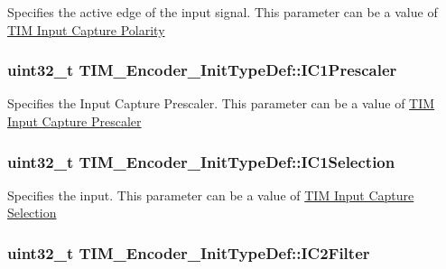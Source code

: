 Specifies the active edge of the input signal. This parameter can be a value of \hyperlink{group___t_i_m___input___capture___polarity}{T\-I\-M Input Capture Polarity} \hypertarget{struct_t_i_m___encoder___init_type_def_a56307eb4766e3f0e1cd1cd3c4fc2157e}{
\subsubsection[{I\-C1\-Prescaler}]{\setlength{\rightskip}{0pt plus 5cm}uint32\-\_\-t T\-I\-M\-\_\-\-Encoder\-\_\-\-Init\-Type\-Def\-::\-I\-C1\-Prescaler}}\label{struct_t_i_m___encoder___init_type_def_a56307eb4766e3f0e1cd1cd3c4fc2157e}
Specifies the Input Capture Prescaler. This parameter can be a value of \hyperlink{group___t_i_m___input___capture___prescaler}{T\-I\-M Input Capture Prescaler} \hypertarget{struct_t_i_m___encoder___init_type_def_a85fbdebacff594ff1ad0d16eddfdc179}{
\subsubsection[{I\-C1\-Selection}]{\setlength{\rightskip}{0pt plus 5cm}uint32\-\_\-t T\-I\-M\-\_\-\-Encoder\-\_\-\-Init\-Type\-Def\-::\-I\-C1\-Selection}}\label{struct_t_i_m___encoder___init_type_def_a85fbdebacff594ff1ad0d16eddfdc179}
Specifies the input. This parameter can be a value of \hyperlink{group___t_i_m___input___capture___selection}{T\-I\-M Input Capture Selection} \hypertarget{struct_t_i_m___encoder___init_type_def_a30cdb580735007aa9735b2f5cc133049}{
\subsubsection[{I\-C2\-Filter}]{\setlength{\rightskip}{0pt plus 5cm}uint32\-\_\-t T\-I\-M\-\_\-\-Encoder\-\_\-\-Init\-Type\-Def\-::\-I\-C2\-Filter}}\label{struct_t_i_m___encoder___init_type_def_a30cdb580735007aa9735b2f5cc133049}
